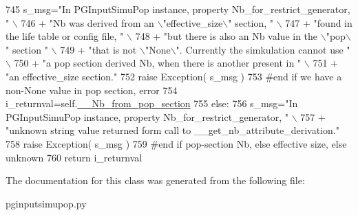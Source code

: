 \begin{DoxyCode}
745                 s\_msg=\textcolor{stringliteral}{"In PGInputSimuPop instance, property Nb\_for\_restrict\_generator, "} \(\backslash\)
746                         + \textcolor{stringliteral}{"Nb was derived from an \(\backslash\)"effective\_size\(\backslash\)" section, "} \(\backslash\)
747                         + \textcolor{stringliteral}{"found in the life table or config file, "} \(\backslash\)
748                         + \textcolor{stringliteral}{"but there is also an Nb value in the \(\backslash\)"pop\(\backslash\)" section "} \(\backslash\)
749                         + \textcolor{stringliteral}{"that is not \(\backslash\)"None\(\backslash\)".  Currently the simkulation cannot use "} \(\backslash\)
750                         + \textcolor{stringliteral}{"a pop section derived Nb, when there is another present in "} \(\backslash\)
751                         + \textcolor{stringliteral}{"an effective\_size section."}
752                 \textcolor{keywordflow}{raise} Exception( s\_msg )
753             \textcolor{comment}{#end if we have a non-None value in pop section, error}
754             i\_returnval=self.\hyperlink{classnegui_1_1pginputsimupop_1_1PGInputSimuPop_a2525ee53b93e309b99914e0cdf175901}{\_\_Nb\_from\_pop\_section}
755         \textcolor{keywordflow}{else}:
756             s\_msg=\textcolor{stringliteral}{"In PGInputSimuPop instance, property Nb\_for\_restrict\_generator, "} \(\backslash\)
757                     + \textcolor{stringliteral}{"unknown string value returned form call to \_\_get\_nb\_attribute\_derivation."} 
758             \textcolor{keywordflow}{raise} Exception( s\_msg )
759         \textcolor{comment}{#end if pop-section Nb, else effective size, else unknown}
760         \textcolor{keywordflow}{return} i\_returnval
\end{DoxyCode}


The documentation for this class was generated from the following file\+:\begin{DoxyCompactItemize}
\item 
pginputsimupop.\+py\end{DoxyCompactItemize}
